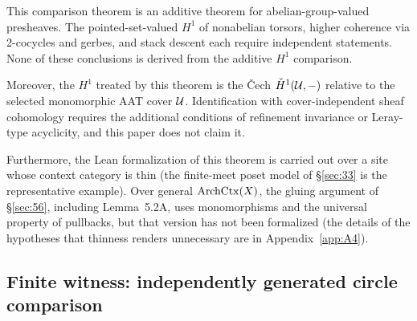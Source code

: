 This comparison theorem is an additive theorem for
abelian-group-valued presheaves. The pointed-set-valued $H^1$ of
nonabelian torsors, higher coherence via 2-cocycles and gerbes, and
stack descent each require independent statements. None of these
conclusions is derived from the additive $H^1$ comparison.

Moreover, the $H^1$ treated by this theorem is the \v{C}ech
$\check H^1(\mathcal{U},-)$ relative to the selected monomorphic AAT cover $\mathcal{U}$.
Identification with cover-independent sheaf cohomology requires the
additional conditions of refinement invariance or Leray-type
acyclicity, and this paper does not claim it.

Furthermore, the Lean formalization of this theorem is carried out
over a site whose context category is thin (the finite-meet poset
model of \S\ref{sec:33} is the representative example). Over general
$\mathrm{ArchCtx}(X)$, the gluing argument of \S\ref{sec:56}, including
Lemma~5.2A, uses monomorphisms and the universal property of
pullbacks, but that version has not been formalized (the details of
the hypotheses that thinness renders unnecessary are in
Appendix~\ref{app:A4}).

\subsection{Finite witness: independently generated circle comparison}\label{sec:58}


